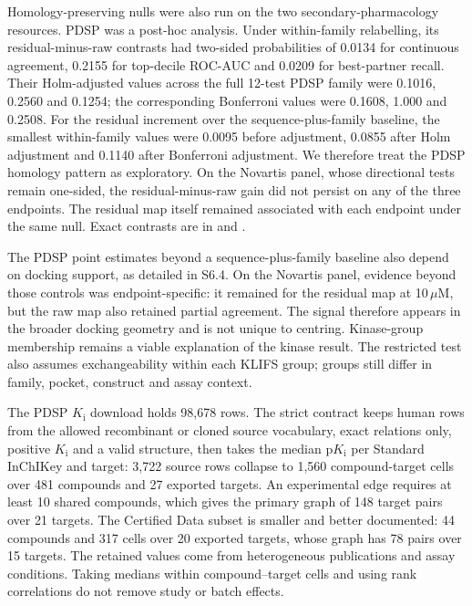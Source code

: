 Homology-preserving nulls were also run on the two secondary-pharmacology resources. PDSP was a
post-hoc analysis. Under within-family relabelling, its residual-minus-raw contrasts had
two-sided probabilities of 0.0134 for continuous agreement, 0.2155 for top-decile ROC-AUC and
0.0209 for best-partner recall. Their Holm-adjusted values across the full 12-test PDSP family
were 0.1016, 0.2560 and 0.1254; the corresponding Bonferroni values were 0.1608, 1.000 and
0.2508. For the residual increment over the sequence-plus-family baseline, the smallest
within-family values were 0.0095 before adjustment, 0.0855 after Holm adjustment and 0.1140 after
Bonferroni adjustment. We therefore treat the PDSP homology pattern as exploratory. On the
Novartis panel, whose directional tests remain one-sided, the residual-minus-raw gain did not
persist on any of the three endpoints. The residual map itself remained associated with each
endpoint under the same null. Exact contrasts are in
 and
.

The PDSP point estimates beyond a sequence-plus-family baseline also depend on docking support,
as detailed in S6.4. On the Novartis panel, evidence beyond those controls was endpoint-specific:
it remained for the residual map at 10\,$\mu$M, but the raw map also retained partial agreement.
The signal therefore appears in the broader docking geometry and is not unique to centring.
Kinase-group membership remains a viable explanation of the kinase result. The restricted test
also assumes exchangeability within each KLIFS group; groups still differ in family, pocket,
construct and assay context.


The PDSP $K_\mathrm{i}$ download holds 98{,}678 rows. The strict contract keeps human rows from
the allowed recombinant or cloned source vocabulary, exact relations only, positive $K_\mathrm{i}$
and a valid structure, then takes the median $\mathrm{p}K_\mathrm{i}$ per Standard InChIKey and
target: 3{,}722 source rows collapse to 1{,}560 compound-target cells over 481 compounds and 27
exported targets. An experimental edge requires at least 10 shared compounds, which gives the
primary graph of 148 target pairs over 21 targets. The Certified Data subset is smaller and
better documented: 44 compounds and 317 cells over 20 exported targets, whose graph has 78 pairs
over 15 targets.
The retained values come from heterogeneous publications and assay conditions. Taking medians
within compound--target cells and using rank correlations do not remove study or batch effects.

